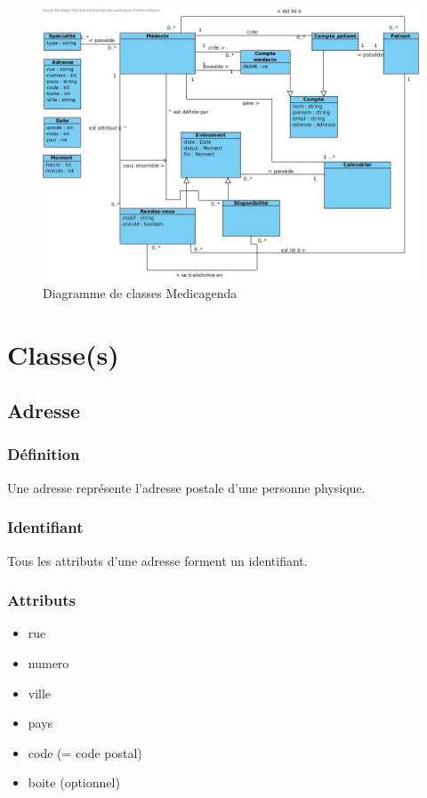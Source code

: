 \documentclass[a4paper, 11pt]{report}
\begin{document}
\begin{figure}[hb]
    \centering
    \includegraphics[scale=0.4]{MCD.jpg}
    \caption{Diagramme de classes Medicagenda}
\end{figure}

\newpage
\section{Classe(s)}


\subsection{Adresse}

\subsubsection{Définition}

Une adresse représente l'adresse postale d'une personne physique.

\subsubsection{Identifiant}

Tous les attributs d'une adresse forment un identifiant.

\subsubsection{Attributs}

\begin{itemize}
    \item rue
    \item numero
    \item ville
    \item pays
    \item code (= code postal)
    \item boite (optionnel)
\end{itemize}
\end{document}
